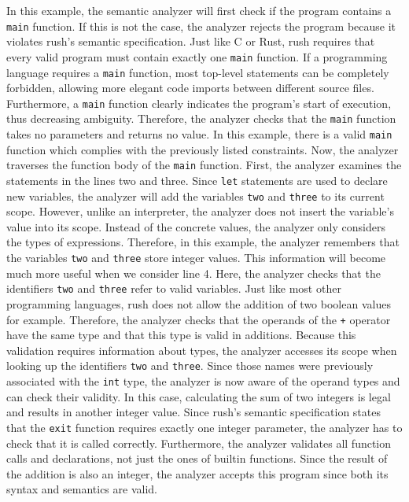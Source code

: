 In this example, the semantic analyzer will first check if the program contains
a \texttt{main} function. If this is not the case, the analyzer rejects the program
because it violates rush's semantic specification. Just like C or Rust, rush
requires that every valid program must contain exactly one \texttt{main} function. If a
programming language requires a \texttt{main} function, most top-level statements can be
completely forbidden, allowing more elegant code imports between different
source files. Furthermore, a \texttt{main} function clearly indicates the program's
start of execution, thus decreasing ambiguity. Therefore, the analyzer checks that
the \texttt{main} function takes no parameters and returns no value. In this
example, there is a valid \texttt{main} function which complies with the previously listed constraints. Now, the analyzer traverses the
function body of the \texttt{main} function. First, the analyzer examines the statements in the lines two and three.
Since \texttt{let} statements are used to declare
new variables, the analyzer will add the variables \texttt{two} and \texttt{three} to its
current scope. However, unlike an interpreter, the analyzer does not insert the
variable's value into its scope. Instead of the concrete values, the analyzer
only considers the types of expressions. Therefore, in this example, the
analyzer remembers that the variables \texttt{two} and \texttt{three} store integer values.
This information will become much more useful when we consider line 4. Here, the
analyzer checks that the identifiers \texttt{two} and \texttt{three} refer to valid variables.
Just like most other programming languages, rush does not allow the addition
of two boolean values for example. Therefore, the analyzer checks that the operands
of the \texttt{+} operator have the same type and that this type is valid in additions.
Because this validation requires information about types, the analyzer accesses
its scope when looking up the identifiers \texttt{two} and \texttt{three}. Since those names
were previously associated with the \texttt{int} type, the analyzer is now aware of the
operand types and can check their validity. In this case, calculating the
sum of two integers is legal and results in another integer value. Since rush's
semantic specification states that the \texttt{exit} function requires exactly one
integer parameter, the analyzer has to check that it is called correctly.
Furthermore, the analyzer validates all function calls and declarations, not
just the ones of builtin functions. Since the result of the addition is also an
integer, the analyzer accepts this program since both its syntax and semantics
are valid.

